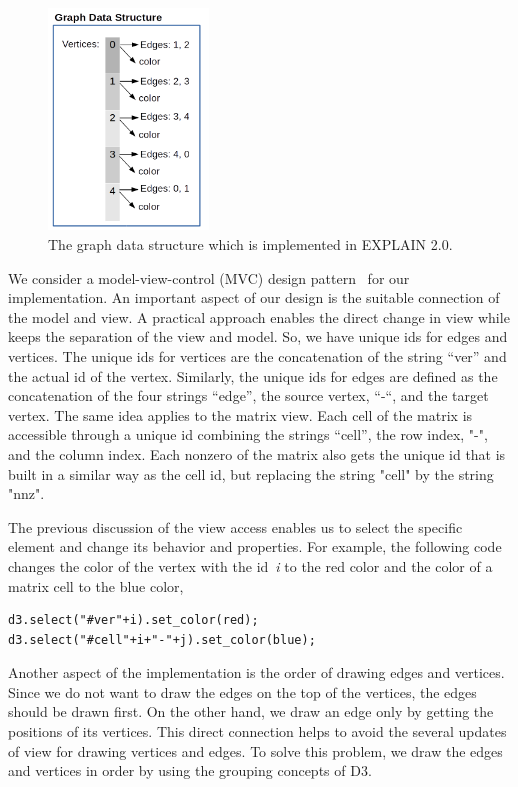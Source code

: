 \documentclass[12pt, twoside,a4paper,toc=bibliography]{scrbook}
\begin{document}
\begin{figure}
\centering
\includegraphics[width=0.38\textwidth]{graph}
\caption{The graph data structure which is implemented in EXPLAIN 2.0.}
\label{f.graph-ds}
\end{figure}
We consider a model-view-control (MVC) design pattern~\cite{osmani2012learning} for our implementation.
An important aspect of our design is the suitable connection of the
model and view. A practical approach enables the direct change in view while keeps the
separation of the view and model.
So, we have unique ids for
edges and vertices. The unique ids for vertices are the concatenation of the
string “ver” and the actual id of the vertex. Similarly, the unique ids for edges are
defined as the concatenation of the four strings “edge”, the source vertex, “-“,
and the target vertex. The same idea applies to the matrix view. Each cell of the matrix
is accessible through a unique id combining the strings “cell”, the row index,
"-", and the column index.
Each nonzero of the matrix also gets the unique id that is built in a similar way
as the cell id, but replacing the string "cell" by the string "nnz".

The previous discussion of the view access enables us to select the
specific element and change its behavior and properties. For example, the following
code changes the color of the vertex with the id~\textit{i} to the red color
and the color of a matrix cell to the blue color,
\begin{lstlisting}
d3.select("#ver"+i).set_color(red);
d3.select("#cell"+i+"-"+j).set_color(blue);
\end{lstlisting}

Another aspect of the implementation is the order of drawing edges and
vertices. Since we do not want to draw the edges on the top of the vertices,
the edges should be drawn first. On the other hand, we draw an edge
only by getting the positions of its vertices. This direct connection helps to avoid
the several updates of view for drawing vertices and edges.
To solve this problem,
we draw the edges and vertices in order by using the grouping concepts of D3.
\end{document}
